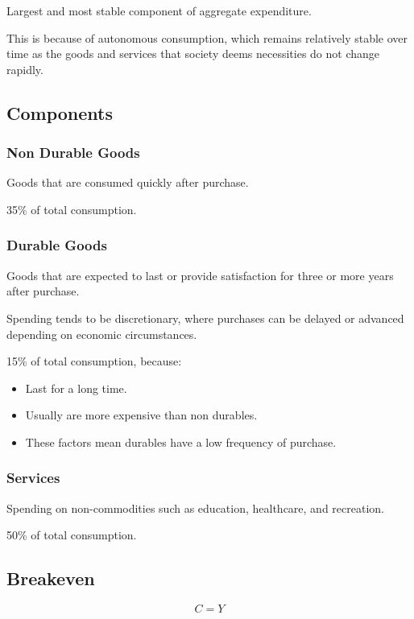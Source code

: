 \documentclass[a4paper,11pt]{article}
\begin{document}
Largest and most stable component of aggregate expenditure.

This is because of autonomous consumption, which remains relatively stable over
time as the goods and services that society deems necessities do not change
rapidly.


\subsection{Components}

\subsubsection{Non Durable Goods}

Goods that are consumed quickly after purchase.

35\% of total consumption.


\subsubsection{Durable Goods}

Goods that are expected to last or provide satisfaction for three or more
years after purchase.

Spending tends to be discretionary, where purchases can be delayed or advanced
depending on economic circumstances.

15\% of total consumption, because:

\begin{itemize}
\item Last for a long time.
\item Usually are more expensive than non durables.
\item These factors mean durables have a low frequency of purchase.
\end{itemize}


\subsubsection{Services}

Spending on non-commodities such as education, healthcare, and recreation.

50\% of total consumption.


\subsection{Breakeven}

$$
C = Y
$$
\end{document}
